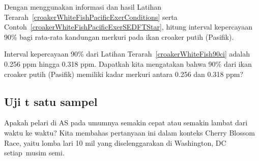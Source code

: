 \begin{exercisewrap}
\begin{nexercise}
\label{croakerWhiteFish90ci}
Dengan menggunakan informasi dan hasil Latihan Terarah~\ref{croakerWhiteFishPacificExerConditions} serta Contoh~\ref{croakerWhiteFishPacificExerSEDFTStar}, hitung interval kepercayaan 90\% bagi rata-rata kandungan merkuri pada ikan croaker putih (Pasifik).\footnotemark{}
\end{nexercise}
\end{exercisewrap}

\begin{exercisewrap}
\begin{nexercise}
Interval kepercayaan 90\% dari
Latihan Terarah~\ref{croakerWhiteFish90ci}
adalah 0.256 ppm hingga 0.318 ppm.
Dapatkah kita mengatakan bahwa 90\% dari ikan croaker putih (Pasifik)
memiliki kadar merkuri antara 0.256 dan 0.318 ppm?\footnotemark{}
\end{nexercise}
\end{exercisewrap}




\subsection[Uji $t$ satu sampel]
    {Uji $\pmb{t}$ satu sampel}
\label{oneSampleTTests}
 
\newcommand{\cherryblossomn}{100}
\newcommand{\cherryblossommean}{97.32}
\newcommand{\cherryblossomnull}{93.29}
\newcommand{\cherryblossomsd}{16.98}
\newcommand{\cherryblossomse}{1.70}
\newcommand{\cherryblossomz}{2.37}

\noindent%
Apakah pelari di AS pada umumnya semakin cepat atau semakin lambat dari waktu ke waktu? Kita membahas pertanyaan ini dalam konteks Cherry Blossom Race, yaitu lomba lari 10 mil yang diselenggarakan di Washington, DC setiap~musim semi.

